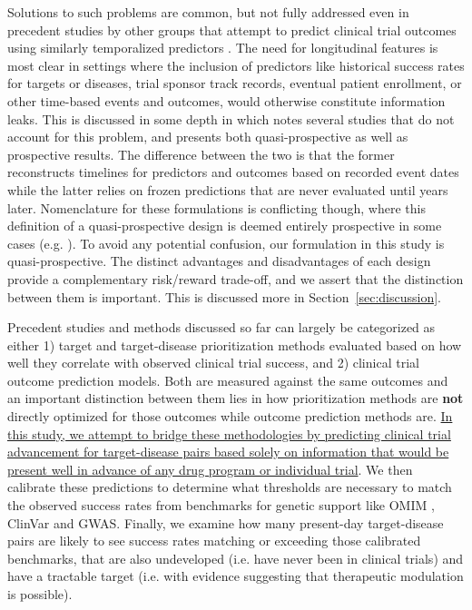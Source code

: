 \documentclass{article}
\begin{document}
Solutions to such problems are common, but not fully addressed even in precedent studies by other groups that attempt to predict clinical trial outcomes using similarly temporalized predictors \cite{PMID:37483175, PMID:34430930, Lo2019Machine}. The need for longitudinal features is most clear in settings where the inclusion of predictors like historical success rates for targets or diseases, trial sponsor track records, eventual patient enrollment, or other time-based events and outcomes, would otherwise constitute information leaks. This is discussed in some depth in \cite{PMID:37483175} which notes several studies that do not account for this problem, and presents both quasi-prospective as well as prospective results. The difference between the two is that the former reconstructs timelines for predictors and outcomes based on recorded event dates while the latter relies on frozen predictions that are never evaluated until years later. Nomenclature for these formulations is conflicting though, where this definition of a quasi-prospective design is deemed entirely prospective in some cases (e.g. \cite{PMID:37225853}). To avoid any potential confusion, our formulation in this study is quasi-prospective. The distinct advantages and disadvantages of each design provide a complementary risk/reward trade-off, and we assert that the distinction between them is important. This is discussed more in Section~\ref{sec:discussion}.

Precedent studies and methods discussed so far can largely be categorized as either 1) target and target-disease prioritization methods evaluated based on how well they correlate with observed clinical trial success, and 2) clinical trial outcome prediction models. Both are measured against the same outcomes and an important distinction between them lies in how prioritization methods are \textbf{not} directly optimized for those outcomes while outcome prediction methods are. \ul{In this study, we attempt to bridge these methodologies by predicting clinical trial advancement for target-disease pairs based solely on information that would be present well in advance of any drug program or individual trial}. We then calibrate these predictions to determine what thresholds are necessary to match the observed success rates from benchmarks for genetic support like OMIM \cite{PMID:15608251}, ClinVar \cite{PMID:24234437} and GWAS. Finally, we examine how many present-day target-disease pairs are likely to see success rates matching or exceeding those calibrated benchmarks, that are also undeveloped (i.e. have never been in clinical trials) and have a tractable target (i.e. with evidence suggesting that therapeutic modulation is possible).
\end{document}
